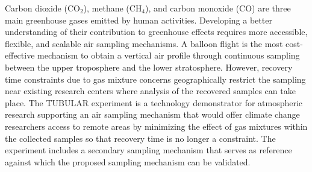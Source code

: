

\newpage
Carbon dioxide (CO$_{2}$), methane (CH$_{4}$), and carbon monoxide (CO) are three main greenhouse gases emitted by human activities. Developing a better understanding of their contribution to greenhouse effects requires more accessible, flexible, and scalable air sampling mechanisms. A balloon flight is the most cost-effective mechanism to obtain a vertical air profile through continuous sampling between the upper troposphere and the lower stratosphere. However, recovery time constraints due to gas mixture concerns geographically restrict the sampling near existing research centers where analysis of the recovered samples can take place. The TUBULAR experiment is a technology demonstrator for atmospheric research supporting an air sampling mechanism that would offer climate change researchers access to remote areas by minimizing the effect of gas mixtures within the collected samples so that recovery time is no longer a constraint. The experiment includes a secondary sampling mechanism that serves as reference against which the proposed sampling mechanism can be validated.


